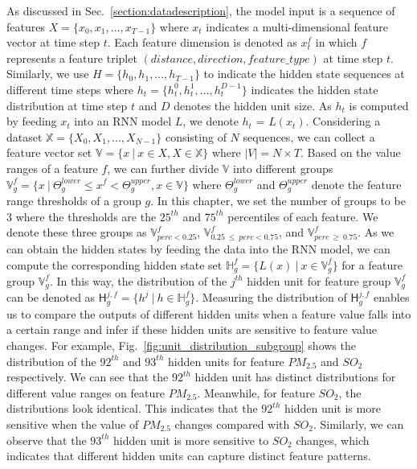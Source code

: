 As discussed in Sec.~\ref{section:datadescription}, the model input is a sequence of features $X=\{x_0, x_1, ..., x_{T-1}\}$ where $x_t$ indicates a multi-dimensional feature vector at time step $t$. 
Each feature dimension is denoted as $x_t^f$ in which $f$ represents a feature triplet $(distance, direction, feature\_type)$ at time step $t$.
Similarly, we use $H=\{h_0, h_1, ..., h_{T-1}\}$ to indicate the hidden state sequences at different time steps where $h_t = \{h_t^0, h_t^1, ..., h_t^{D-1}\}$ indicates the hidden state distribution at time step $t$ and $D$ denotes the hidden unit size.
As $h_t$ is computed by feeding $x_t$ into an RNN model $L$, we denote $h_t$ = $L(x_t)$.
Considering a dataset  $\mathbb{X} = \{X_0, X_1, ..., X_{N-1}\}$ consisting of $N$ sequences, we can collect a feature vector set $\mathbb{V} = \{x~|~x \in X, X \in \mathbb{X}\}$ where $|V| = N \times T$. 
Based on the value ranges of a feature $f$, we can further divide $\mathbb{V}$ into different groups $\mathbb{V}_g^{f}=\{x~|~\Theta_g^{lower} \leq x^f < \Theta_g^{upper}, x \in \mathbb{V}\}$ where $\Theta_g^{lower}$ and $\Theta_g^{upper}$ denote the feature range thresholds of a group $g$.
In this chapter, we set the number of groups to be $3$ where the thresholds are the $25^{th}$ and $75^{th}$ percentiles of each feature.
We denote these three groups as $\mathbb{V}_{perc<0.25}^{f}$, $\mathbb{V}_{0.25~\leq~perc<0.75}^{f}$, and $\mathbb{V}_{perc~\geq~0.75}^{f}$. 
As we can obtain the hidden states by feeding the data into the RNN model, we can compute the corresponding hidden state set $\mathbb{H}_g^{f} = \{L(x)~|~x \in \mathbb{V}_g^{f}\}$ for a feature group $\mathbb{V}_g^{f}$.
In this way, the distribution of the $j^{th}$ hidden unit for feature group $\mathbb{V}_g^{f}$ can be denoted as $\mathsf{H}_g^{j, f}=\{h^j~|~h \in \mathbb{H}_g^{f}\}$.
Measuring the distribution of $\mathsf{H}_g^{j, f}$ enables us to compare the outputs of different hidden units when a feature value falls into a certain range and infer if these hidden units are sensitive to feature value changes.
For example, Fig.~\ref{fig:unit_distribution_subgroup} shows the distribution of the $92^{th}$ and $93^{th}$ hidden units for feature $PM_{2.5}$ and $SO_2$ respectively.
We can see that the $92^{th}$ hidden unit has distinct distributions for different value ranges on feature $PM_{2.5}$.
Meanwhile, for feature $SO_2$, the distributions look identical.
This indicates that the $92^{th}$ hidden unit is more sensitive when the value of $PM_{2.5}$ changes compared with $SO_2$.
Similarly, we can observe that the $93^{th}$ hidden unit is more sensitive to $SO_2$ changes, which indicates that different hidden units can capture distinct feature patterns.


